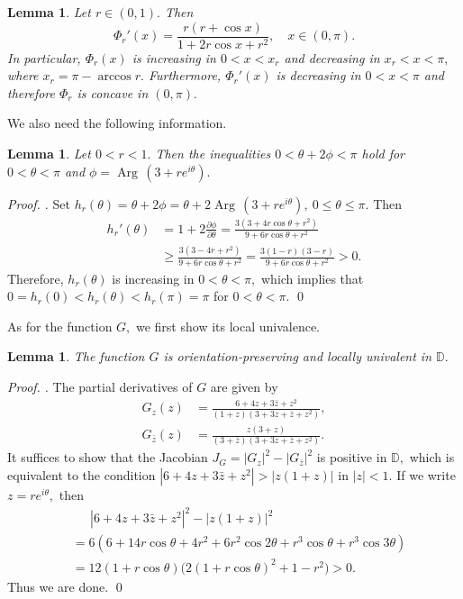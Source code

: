 \documentclass[a4paper,12pt]{amsart}
\numberwithin{equation}{section}
\newtheorem{lem}[thm]{Lemma}
\theoremstyle{definition}
\newenvironment{pf}[1][]{ \vskip 3mm
 \noindent
 \ifthenelse{\equal{#1}{}}  {{\slshape Proof. }}  {{\slshape #1.} } }{\qed\bigskip}
\begin{document}
\begin{lem}\label{lem:Phi}
Let $r\in(0,1).$
Then
$$
\Phi_r'(x)=\frac{r(r+\cos x)}{1+2r\cos x+r^2},
\quad x\in(0,\pi).
$$
In particular, $\Phi_r(x)$ is increasing in $0<x<x_r$
and decreasing in $x_r<x<\pi,$ where
$x_r=\pi-\arccos r.$
Furthermore, $\Phi_r'(x)$ is decreasing in $0<x<\pi$
and therefore $\Phi_r$ is concave in $(0,\pi).$
\end{lem}

We also need the following information.

\begin{lem}\label{lem:phi}
Let $0<r<1.$
Then the inequalities $0<\theta+2\phi<\pi$ hold
for $0<\theta<\pi$ and $\phi={{\operatorname{Arg}\,}}(3+re^{i\theta}).$
\end{lem}

\begin{pf}
Set $h_r(\theta)=\theta+2\phi
=\theta+2{{\operatorname{Arg}\,}}(3+re^{i\theta}),~0\le\theta\le\pi.$
Then
\begin{align*}
h_r'(\theta)&=1+2\frac{\partial\phi}{\partial\theta}
=\frac{3(3+4r\cos\theta+r^2)}{9+6r\cos\theta+r^2} \\
&\ge\frac{3(3-4r+r^2)}{9+6r\cos\theta+r^2}
=\frac{3(1-r)(3-r)}{9+6r\cos\theta+r^2}>0.
\end{align*}
Therefore, $h_r(\theta)$ is increasing in $0<\theta<\pi,$
which implies that $0=h_r(0)<h_r(\theta)<h_r(\pi)=\pi$ for $0<\theta<\pi.$
\end{pf}

As for the function $G,$ we first show its local univalence.

\begin{lem}\label{lem:lu}
The function $G$ is orientation-preserving and locally univalent in ${{\mathbb D}}.$
\end{lem}

\begin{pf}
The partial derivatives of $G$ are given by
\begin{align*}
G_z(z)&=\frac{6+4z+3\bar z+z^2}{(1+z)(3+3z+\bar z+z^2)}, \\
G_{\bar z}(z)&=\frac{z(3+z)}{(3+\bar z)(3+3z+\bar z+z^2)}.
\end{align*}
It suffices to show that the Jacobian $J_G=|G_z|^2-|G_{\bar z}|^2$
is positive in ${{\mathbb D}},$ which is equivalent to the condition
$|6+4z+3\bar z+z^2|>|z(1+z)|$ in $|z|<1.$
If we write $z=re^{i\theta},$ then
\begin{align*}
&\quad\ \  |6+4z+3\bar z+z^2|^2-|z(1+z)|^2 \\
&=6(6+14r\cos\theta+4r^2+6r^2\cos2\theta+r^3\cos\theta+r^3\cos3\theta) \\
&=12(1+r\cos\theta)\big(2(1+r\cos\theta)^2+1-r^2\big)>0.
\end{align*}
Thus we are done.
\end{pf}
\end{document}
